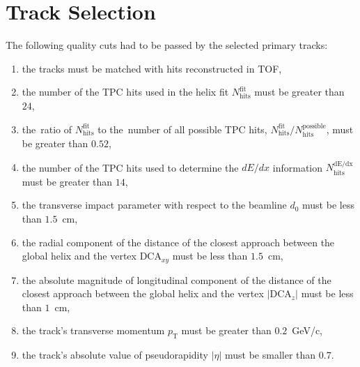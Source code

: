 \section{Track Selection}\label{section:star_track_selection}
The following quality cuts had to be passed by the selected primary tracks:


\begin{enumerate}
	\item the tracks must be matched with hits reconstructed in TOF,
	\item the number of the  TPC hits used in the helix fit $N_{\textrm{hits}}^{\textrm{fit}}$ must be greater than $24$,
	\item the~ratio of $N_{\textrm{hits}}^{\textrm{fit}}$ to the~number of all possible TPC hits, $N_{\textrm{hits}}^{\textrm{fit}}/N_{\textrm{hits}}^{\textrm{possible}}$, must be greater than $0.52$,
	\item the number of the  TPC hits used to determine the $dE/dx$ information $N_{\textrm{hits}}^{\textrm{dE/dx}}$ must be greater than $14$,
	\item the transverse impact parameter with respect to the beamline $d_0$ must be less than $1.5$~cm,
	\item the radial component of the distance of the closest approach between  the global helix and the vertex $\textrm{DCA}_{xy}$ must be less than $1.5$~cm,
	\item the absolute magnitude of  longitudinal component of the distance of the closest approach between  the global helix and the vertex $|\textrm{DCA}_{z}|$ must be less than $1$~cm,
	\item the track's transverse momentum $p_\textrm{T}$ must be greater than $0.2$~GeV/c,
	\item the track's absolute value of  pseudorapidity $|\eta|$ must be smaller than $0.7$.
\end{enumerate}

